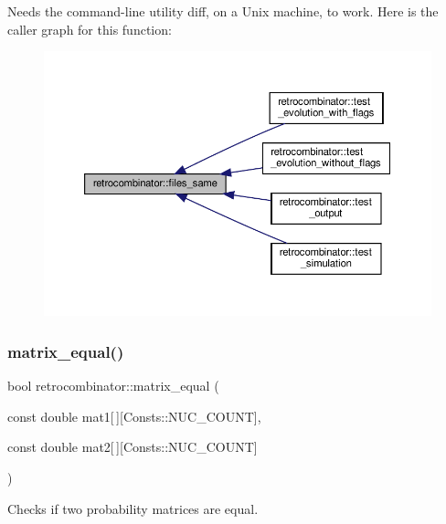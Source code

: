 Needs the command-\/line utility diff, on a Unix machine, to work. Here is the caller graph for this function\+:
\nopagebreak
\begin{figure}[H]
\begin{center}
\leavevmode
\includegraphics[width=350pt]{namespaceretrocombinator_aadb27262663ae58fda77172ae3d828dc_icgraph}
\end{center}
\end{figure}
\mbox{\label{namespaceretrocombinator_a0e4387f4392819cd377c71d5771b39b1}} 
\subsubsection{\texorpdfstring{matrix\+\_\+equal()}{matrix\_equal()}}
{\footnotesize\ttfamily bool retrocombinator\+::matrix\+\_\+equal (\begin{DoxyParamCaption}\item[{const double}]{mat1\mbox{[}$\,$\mbox{]}\mbox{[}\+Consts\+::\+N\+U\+C\+\_\+\+C\+O\+U\+N\+T\mbox{]},  }\item[{const double}]{mat2\mbox{[}$\,$\mbox{]}\mbox{[}\+Consts\+::\+N\+U\+C\+\_\+\+C\+O\+U\+N\+T\mbox{]} }\end{DoxyParamCaption})}



Checks if two probability matrices are equal. 

